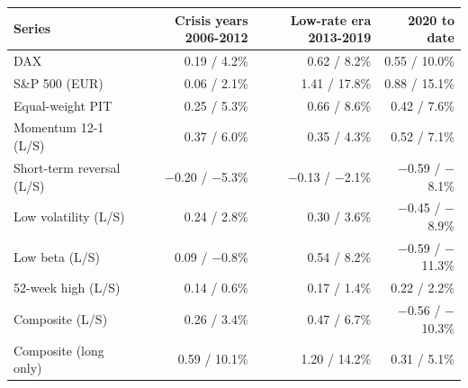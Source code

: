 \begin{tabular}{lrrr}
\toprule
Series & Crisis years 2006-2012 & Low-rate era 2013-2019 & 2020 to date \\
\midrule
DAX & 0.19 / 4.2\% & 0.62 / 8.2\% & 0.55 / 10.0\% \\
S\&P 500 (EUR) & 0.06 / 2.1\% & 1.41 / 17.8\% & 0.88 / 15.1\% \\
Equal-weight PIT & 0.25 / 5.3\% & 0.66 / 8.6\% & 0.42 / 7.6\% \\
\midrule
Momentum 12-1 (L/S) & 0.37 / 6.0\% & 0.35 / 4.3\% & 0.52 / 7.1\% \\
Short-term reversal (L/S) & $-$0.20 / $-$5.3\% & $-$0.13 / $-$2.1\% & $-$0.59 / $-$8.1\% \\
Low volatility (L/S) & 0.24 / 2.8\% & 0.30 / 3.6\% & $-$0.45 / $-$8.9\% \\
Low beta (L/S) & 0.09 / $-$0.8\% & 0.54 / 8.2\% & $-$0.59 / $-$11.3\% \\
52-week high (L/S) & 0.14 / 0.6\% & 0.17 / 1.4\% & 0.22 / 2.2\% \\
Composite (L/S) & 0.26 / 3.4\% & 0.47 / 6.7\% & $-$0.56 / $-$10.3\% \\
\midrule
Composite (long only) & 0.59 / 10.1\% & 1.20 / 14.2\% & 0.31 / 5.1\% \\
\bottomrule
\end{tabular}
